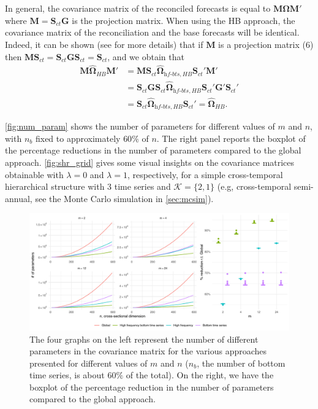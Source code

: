 \documentclass[a4paper,11pt]{article}
\newcommand{\Gvet}{\bm{G}}
\newcommand{\Mvet}{\bm{M}}
\newcommand{\Svet}{\bm{S}}
\newcommand{\Omegavet}{\bm{\Omega}}
\theoremstyle{definition}
\begin{document}
In general, the covariance matrix of the reconciled forecasts is equal to $\Mvet \widehat{\Omegavet} \Mvet'$ where $\Mvet = \Svet_{ct}\Gvet$ is the projection matrix. When using the HB approach, the covariance matrix of the reconciliation and the base forecasts will be identical. Indeed, it can be shown (see \citealp{panagiotelis2021} for more details) that if $\Mvet$ is a projection matrix (6) then $\Mvet\Svet_{ct} = \Svet_{ct}\Gvet\Svet_{ct} = \Svet_{ct}$, and we obtain that
\begin{align*}
	\Mvet \widehat{\Omegavet}_{HB} \Mvet' & = \Mvet\Svet_{ct}\widehat{\Omegavet}_{\textit{hf-bts}, HB}\Svet_{ct}'\Mvet'                      \\
	& = \Svet_{ct}\Gvet\Svet_{ct}\widehat{\Omegavet}_{\textit{hf-bts}, HB}\Svet_{ct}'\Gvet'\Svet_{ct}' \\
	& = \Svet_{ct}\widehat{\Omegavet}_{\textit{hf-bts}, HB}\Svet_{ct}' = \widehat{\Omegavet}_{HB}.
\end{align*}

\autoref{fig:num_param} shows the number of parameters for different values of $m$ and $n$, with $n_b$ fixed to approximately $60\%$ of $n$. The right panel reports the boxplot of the percentage reductions in the number of parameters compared to the global approach.
\autoref{fig:shr_grid} gives some visual insights on the covariance matrices obtainable with $\lambda=0$ and $\lambda=1$, respectively, for a simple cross-temporal hierarchical structure with 3 time series and $\mathcal{K}=\{2,1\}$ (e.g, cross-temporal semi-annual, see the Monte Carlo simulation in \autoref{sec:mcsim}).

\begin{figure}[!t]
	\centering
	\includegraphics[width = \linewidth]{fig/parameters.pdf}
	\caption{The four graphs on the left represent the number of different parameters in the covariance matrix for the various approaches presented for different values of $m$ and $n$ ($n_b$, the number of bottom time series, is about $60\%$ of the total). On the right, we have the boxplot of the percentage reduction in the number of parameters compared to the global approach.}
	\label{fig:num_param}
\end{figure}
\end{document}
